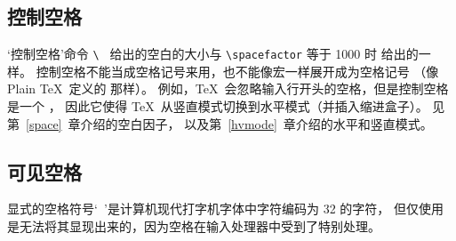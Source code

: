 \documentclass{book}
\begin{document}
\subsection{控制空格}

`控制空格'命令 \verb*-\ - 给出的空白的大小与
\verb=\spacefactor= 等于 1000 时  给出的一样。
控制空格不能当成空格记号来用，也不能像宏一样展开成为空格记号%
（像 Plain \TeX\ 定义的  那样）。
例如，\TeX\ 会忽略输入行开头的空格，但是控制空格是一个 ，
因此它使得 \TeX\ 从竖直模式切换到水平模式（并插入缩进盒子）。
见第~\ref{space}~章介绍的空白因子，
以及第~\ref{hvmode}~章介绍的水平和竖直模式。

\subsection{可见空格}

显式的空格符号`\verb*- -'是计算机现代打字机字体中字符编码为 32 的字符，
但仅使用  是无法将其显现出来的，因为空格在输入处理器中受到了特别处理。
\end{document}
